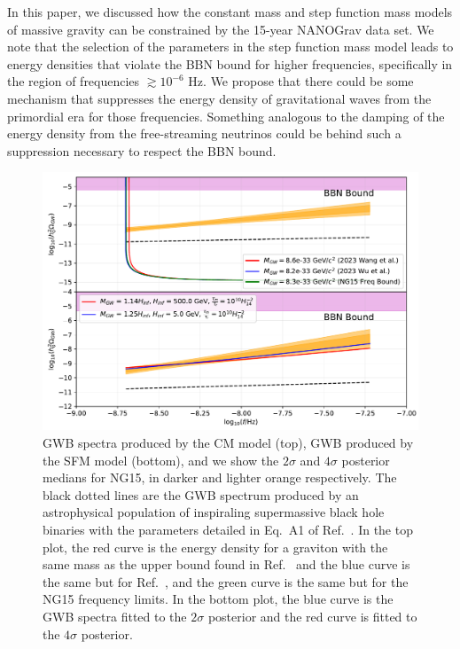 \documentclass[prd,twocolumn,aps,psfig,nofootinbib,nobibnotes,superscriptaddress,preprintnumbers,times]{revtex4-2}
\begin{document}
In this paper, we discussed how the constant mass and step function mass models of massive gravity can be constrained by the 15-year NANOGrav data set. We note that the selection of the parameters in the step function mass model leads to energy densities that violate the BBN bound for higher frequencies, specifically in the region of frequencies $\gtrsim 10^{-6}$ Hz. We propose that there could be some mechanism that suppresses the energy density of gravitational waves from the primordial era for those frequencies. Something analogous to the damping of the energy density from the free-streaming neutrinos \cite{Weinberg:2004} could be behind such a suppression necessary to respect the BBN bound. 

\onecolumngrid
\begin{figure}
\includegraphics[width=\textwidth]{fig/fig8.pdf} 
\caption{GWB spectra produced by the CM model \cite{Gumrukcuoglu:2012} (top), GWB produced by the SFM model \cite{Fujita:2018} (bottom), and we show the $2\sigma$ and $4\sigma$ posterior medians for NG15, in darker and lighter orange respectively. The black dotted lines are the GWB spectrum produced by an astrophysical population of inspiraling supermassive black hole binaries with the parameters detailed in Eq.\ A1 of Ref.\ \cite{Afzal:2023}. In the top plot, the red curve is the energy density for a graviton with the same mass as the upper bound found in Ref.\ \cite{Wang:2023} and the blue curve is the same but for Ref.\ \cite{Wu:2023}, and the green curve is the same but for the NG15 frequency limits. In the bottom plot, the blue curve is the GWB spectra fitted to the $2\sigma$ posterior and the red curve is fitted to the $4\sigma$ posterior.}
\label{fig:GWB}
\end{figure}
\twocolumngrid
\end{document}
